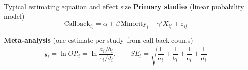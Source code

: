 \begin{frame}{Typical estimating equation and effect size}
  \textbf{Primary studies} (linear probability model)
  \[
    \text{Callback}_{ij} = \alpha + \beta\,\text{Minority}_i
      + \gamma' X_{ij} + \varepsilon_{ij}
  \]

  \medskip
  \textbf{Meta-analysis} (one estimate per study, from call-back counts)
  \[
    y_i = \ln OR_i = \ln \frac{a_i/b_i}{c_i/d_i},
    \qquad
    SE_i = \sqrt{\frac{1}{a_i} + \frac{1}{b_i} + \frac{1}{c_i} + \frac{1}{d_i}}
  \]
  \\
\end{frame}
